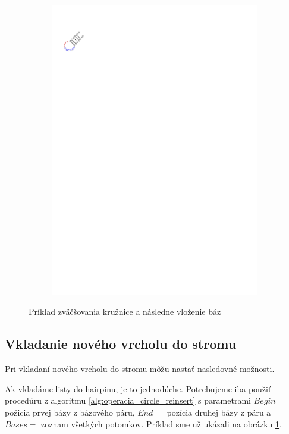 \begin{figure}
\begin{subfigure}{\wi}
    \includegraphics[trim=1cm 24.5cm 17.5cm 2.5cm]{../img/alg/insert/1/circle-big-end}
  \end{subfigure}

  \caption{Príklad zväčšovania kružnice a následne vloženie báz}
  \label{obr:insert_circle_hairpin}
\end{figure}





\subsection{Vkladanie nového vrcholu do stromu}

Pri vkladaní nového vrcholu do stromu môžu nastať nasledovné možnosti.

Ak vkladáme listy do hairpinu, je to jednodúche. Potrebujeme iba použiť
procedúru z algoritmu \ref{alg:operacia_circle_reinsert}
s parametrami $Begin = $ požicia prvej bázy z bázového páru, $End = $ pozícia
druhej bázy z páru a $Bases = $ zoznam všetkých potomkov.
Príklad sme už ukázali na obrázku \ref{obr:insert_circle_hairpin}.

